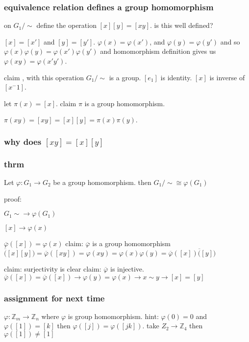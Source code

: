 \documentclass[letterpaper]{article}
\begin{document}
\subsubsection*{equivalence relation defines a group  homomorphism}
on $G_1/\sim$ define the operation $[x][y]=[xy]$. is this well defined?

$[x]=[x']$ and $[y]=[y']$. $\varphi(x)=\varphi(x')$, and $\varphi(y)=\varphi(y')$ and so $\varphi(x)\varphi(y)=\varphi(x')\varphi(y')$ and homomorphism definition gives us $\varphi(xy)=\varphi(x'y')$.

claim , with this operation $G_1/\sim$ is a group. $[e_1]$ is identity. $[x]$ is inverse of $[x^-1]$.

let $\pi(x)=[x]$. claim $\pi$ is a group homomorphism.

$\pi(xy)=[xy]=[x][y]=\pi(x)\pi(y)$.

\subsubsection*{why does $[xy]=[x][y]$}
\subsubsection*{thrm}
Let $\varphi:G_1\to G_2$ be a group homomorphism. then $G_1/\sim\cong\varphi(G_1)$

proof:

$G_1\sim\to\varphi(G_1)$

$[x]\to\varphi(x)$

$\overline\varphi([x])=\varphi(x)$
claim: $\overline\varphi$ is a group homomorphism
$\overline([x][y])=\overline\varphi([xy])=\varphi(xy)=\varphi(x)\varphi(y)=\overline\varphi([x])\overline([y])$

claim: surjectivity is clear
claim: $\overline\varphi$ is injective.
$\overline\varphi([x])=\overline{\varphi}([x])\to \varphi(y)=\varphi(x)\to x\sim y\to [x]=[y]$

\subsubsection*{assignment for next time}
$\varphi:\mathbb{Z}_m\to\mathbb{Z}_n$ where $\varphi$ is group homomorphism. hint: $\varphi(0)=0$ and $\varphi([1])=[k]$ then $\varphi([j])=\varphi([jk])$. take $Z_2\to\mathbb{Z}_4$ then $\varphi([1])\ne[1]$
\end{document}
